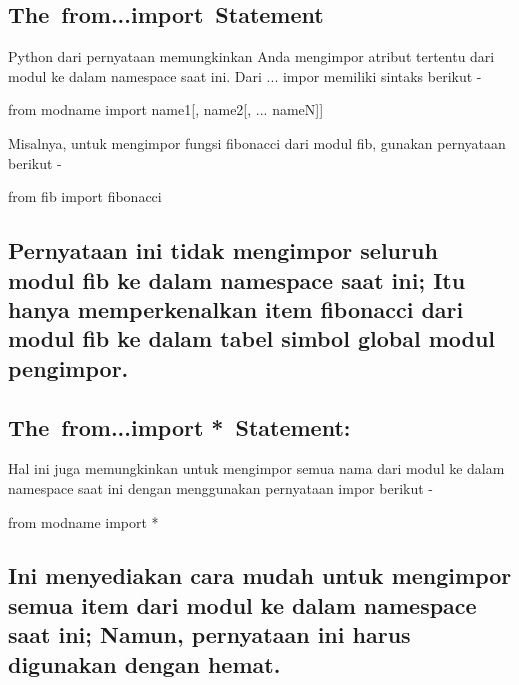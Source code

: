 \documentclass[a4paper,12pt]{report}
\begin{document}
\subsection*{The from...import Statement}
 \par
\begin{adjustwidth}{0.03in}{0.03in}
Python dari pernyataan memungkinkan Anda mengimpor atribut tertentu dari modul ke dalam namespace saat ini. Dari ... impor memiliki sintaks berikut -\end{adjustwidth}
 \par
\noindent 
 \hspace*{0.5in} from modname import name1[, name2[, ... nameN]] \par
\begin{adjustwidth}{0.03in}{0.03in}
Misalnya, untuk mengimpor fungsi fibonacci dari modul fib, gunakan pernyataan berikut -\end{adjustwidth}
 \par
\noindent 
 \hspace*{0.5in} from fib import fibonacci \par
\subsection*{Pernyataan ini tidak mengimpor seluruh modul fib ke dalam namespace saat ini; Itu hanya memperkenalkan item fibonacci dari modul fib ke dalam tabel simbol global modul pengimpor.}
 \par
\vspace{12pt}
\subsection*{The from...import * Statement:}
 \par
\begin{adjustwidth}{0.03in}{0.03in}
Hal ini juga memungkinkan untuk mengimpor semua nama dari modul ke dalam namespace saat ini dengan menggunakan pernyataan impor berikut -\end{adjustwidth}
 \par
\noindent 
 \hspace*{0.5in} from modname import * \par
\subsection*{Ini menyediakan cara mudah untuk mengimpor semua item dari modul ke dalam namespace saat ini; Namun, pernyataan ini harus digunakan dengan hemat.}
 \par
\vspace{12pt}
\end{document}
